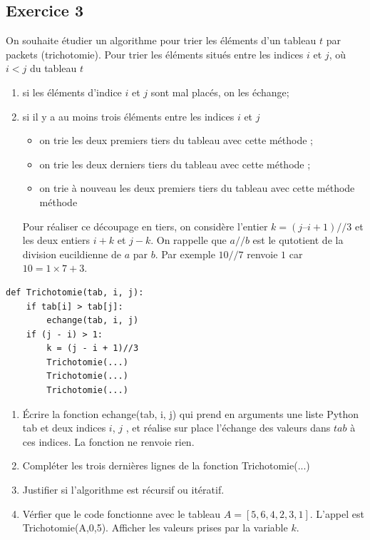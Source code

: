 \documentclass[a4paper,12pt]{article}
\begin{document}
\subsection{Exercice 3}
\begin{leftbar}
On souhaite étudier un  algorithme pour trier les éléments d'un tableau $t$ par packets (trichotomie).
Pour trier les éléments situés entre les indices $i$ et $j$, où $i < j$ du tableau $t$
\begin{enumerate}
\item si les éléments d’indice $i$ et $j$ sont mal placés, on les échange;
\item si il y a au moins trois éléments entre les indices $i$ et $j$
\begin{itemize}
\item on trie les deux premiers tiers du tableau avec cette méthode ;
\item on trie les deux derniers tiers du tableau avec cette méthode ;
\item on trie à nouveau les deux premiers tiers du tableau avec cette m\'ethode
méthode
\end{itemize}
Pour réaliser ce découpage en tiers, on considère l’entier $k=(j – i + 1) // 3$ et les deux entiers $i+k$ et $j-k$. On rappelle que $a//b$ est le qutotient de la division eucildienne de $a$ par $b$. Par exemple $10//7$ renvoie $1$ car $10=1\times 7+3$.
\end{enumerate}
	
\begin{lstlisting}
def Trichotomie(tab, i, j):
	if tab[i] > tab[j]:
		echange(tab, i, j)
	if (j - i) > 1:
		k = (j - i + 1)//3
		Trichotomie(...)
		Trichotomie(...)
		Trichotomie(...)
\end{lstlisting} 

\begin{enumerate}
\item Écrire la fonction echange(tab, i, j) qui prend en arguments une liste
Python tab et deux indices $i$, $j$ , et réalise sur place l’échange des valeurs
dans $tab$ à ces indices. La fonction ne renvoie rien.
\item Compléter les trois dernières lignes de la fonction Trichotomie(...) 
\item Justifier si l'algorithme est r\'ecursif ou it\'eratif.
\item V\'erfier que le code fonctionne avec le tableau $A = [5, 6, 4, 2, 3, 1]$. L'appel est Trichotomie(A,0,5). Afficher les valeurs prises par la variable $k$.
\end{enumerate}
\end{leftbar}
\end{document}
